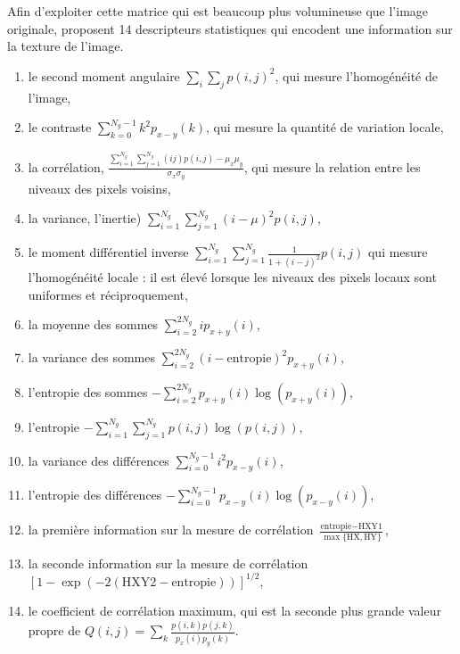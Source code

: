 Afin d'exploiter cette matrice qui est beaucoup plus volumineuse que l'image originale, \citeauthor{haralick_textural_1973} proposent 14 descripteurs statistiques qui encodent une information sur la texture de l'image.
\begin{enumerate}
	\item le second moment angulaire  $\sum_{i} \sum_{j} p(i, j)^{2}$, qui mesure l'homogénéité de l'image,
	\item le contraste $\sum_{k=0}^{N_{g}-1} k^{2} p_{x-y}(k)$, qui mesure la quantité de variation locale,
	\item la corrélation, $\frac{\sum_{i=1}^{N_{g}} \sum_{j=1}^{N_{g}}(i j) p(i, j)-\mu_{x} \mu_{y}}{\sigma_{x} \sigma_{y}}$, qui mesure la relation entre les niveaux des pixels voisins,
	\item la variance, l'inertie) $\sum_{i=1}^{N_{g}} \sum_{j=1}^{N_{g}}(i-\mu)^{2} p(i, j)$,
	\item le moment différentiel inverse $\sum_{i=1}^{N_{g}} \sum_{j=1}^{N_{g}} \frac{1}{1+(i-j)^{2}} p(i, j)$ qui mesure l'homogénéité locale : il est élevé lorsque les niveaux des pixels locaux sont uniformes et réciproquement,
	\item la moyenne des sommes $\sum_{i=2}^{2 N_{g}} i p_{x+y}(i)$,
	\item la variance des sommes $\sum_{i=2}^{2 N_{g}}\left(i-\text{entropie}\right)^{2} p_{x+y}(i)$,
	\item l’entropie des sommes $-\sum_{i=2}^{2 N_{g}} p_{x+y}(i) \log \left(p_{x+y}(i)\right)$,
	\item l’entropie $-\sum_{i=1}^{N_{g}} \sum_{j=1}^{N_{g}} p(i, j) \log (p(i, j))$,
	\item la variance des différences $\sum_{i=0}^{N_{g}-1} i^{2} p_{x-y}(i)$,
	\item l’entropie des différences $-\sum_{i=0}^{N_{g}-1} p_{x-y}(i) \log \left(p_{x-y}(i)\right)$,
	\item la première information sur la mesure de corrélation $\frac{\text{entropie} - \text{HXY1}}{\max \{\text{HX}, \text{HY}\}}$,
	\item la seconde information sur la mesure de corrélation $\left[1-\exp \left(-2\left(\text{HXY2}-\text{entropie}\right)\right)\right]^{1 / 2}$,
	\item le coefficient de corrélation maximum, qui est la seconde plus grande valeur propre de $Q(i, j)=\sum_{k} \frac{p(i, k) p(j, k)}{p_{x}(i) p_{y}(k)}$.
\end{enumerate}


